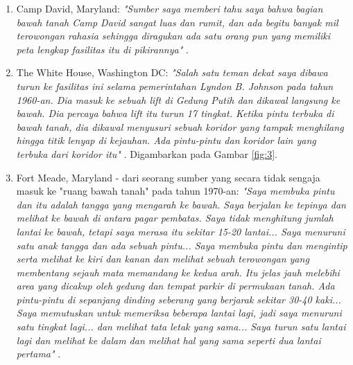 \documentclass[10pt,twocolumn,letterpaper]{article}
\begin{document}
\begin{flushleft}
\begin{enumerate}
    \item Camp David, Maryland: \textit{"Sumber saya memberi tahu saya bahwa bagian bawah tanah Camp David sangat luas dan rumit, dan ada begitu banyak mil terowongan rahasia sehingga diragukan ada satu orang pun yang memiliki peta lengkap fasilitas itu di pikirannya"} \cite{22}.
    \item The White House, Washington DC: \textit{"Salah satu teman dekat saya dibawa turun ke fasilitas ini selama pemerintahan Lyndon B. Johnson pada tahun 1960-an. Dia masuk ke sebuah lift di Gedung Putih dan dikawal langsung ke bawah. Dia percaya bahwa lift itu turun 17 tingkat. Ketika pintu terbuka di bawah tanah, dia dikawal menyusuri sebuah koridor yang tampak menghilang hingga titik lenyap di kejauhan. Ada pintu-pintu dan koridor lain yang terbuka dari koridor itu"} \cite{22}. Digambarkan pada Gambar \ref{fig:3}.
    \item Fort Meade, Maryland - dari seorang sumber yang secara tidak sengaja masuk ke "ruang bawah tanah" pada tahun 1970-an: \textit{"Saya membuka pintu dan itu adalah tangga yang mengarah ke bawah. Saya berjalan ke tepinya dan melihat ke bawah di antara pagar pembatas. Saya tidak menghitung jumlah lantai ke bawah, tetapi saya merasa itu sekitar 15-20 lantai... Saya menuruni satu anak tangga dan ada sebuah pintu... Saya membuka pintu dan mengintip serta melihat ke kiri dan kanan dan melihat sebuah terowongan yang membentang sejauh mata memandang ke kedua arah. Itu jelas jauh melebihi area yang dicakup oleh gedung dan tempat parkir di permukaan tanah. Ada pintu-pintu di sepanjang dinding seberang yang berjarak sekitar 30-40 kaki... Saya memutuskan untuk memeriksa beberapa lantai lagi, jadi saya menuruni satu tingkat lagi... dan melihat tata letak yang sama... Saya turun satu lantai lagi dan melihat ke dalam dan melihat hal yang sama seperti dua lantai pertama"} \cite{22}.
\end{enumerate}
\end{flushleft}
\end{document}
